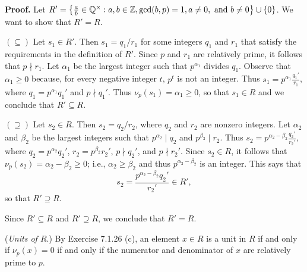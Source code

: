 \begin{enumerate}
      \textbf{Proof.} Let $R' = \left\{\frac{a}{b} \in \mathbb{Q}^\times : a, b \in \mathbb{Z}, 
      \gcd(b, p) = 1, a \neq 0, \text{ and } b \neq 0\right\} \cup \{0\}$. We 
      want to show that $R' = R$.

      $(\subseteq)$ Let $s_1 \in R'$. Then $s_1 = q_1/r_1$ for some integers
      $q_1$ and $r_1$ that satisfy the requirements in the definition of $R'$. 
      Since $p$ and $r_1$ are relatively prime, it follows that $p \nmid r_1$. 
      Let $\alpha_1$ be the largest integer such that $p^{\alpha_1}$ divides
      $q_1$. Observe that $\alpha_1 \ge 0$ because, for every negative integer
      $t$, $p^t$ is not an integer. Thus $s_1 = p^{\alpha_1}\frac{q_1'}{r_1}$, 
      where $q_1 = p^{\alpha_1}q_1'$ and $p \nmid q_1'$. Thus
      $\nu_p(s_1) = \alpha_1 \ge 0$, so that $s_1 \in R$ and we conclude that
      $R' \subseteq R$.
   
      $(\supseteq)$ Let $s_2 \in R$. Then $s_2 = q_2/r_2$, where $q_2$ and $r_2$
      are nonzero integers. Let $\alpha_2$ and $\beta_2$ be the largest integers
      such that $p^{\alpha_2} \mid q_2$ and $p^{\beta_2} \mid r_2$. Thus
      $s_2 = p^{\alpha_2-\beta_2}\frac{q_2'}{r_2'}$, where
      $q_2 = p^{\alpha_2}q_2'$, $r_2 = p^{\beta_2}r_2'$, $p \nmid q_2'$, and
      $p \nmid r_2'$. Since $s_2 \in R$, it follows that
      $\nu_p(s_2) = \alpha_2 - \beta_2 \ge 0$; i.e., $\alpha_2 \ge \beta_2$ and
      thus $p^{\alpha_2-\beta_2}$ is an integer. This says that
      $$s_2 = \frac{p^{\alpha_2-\beta_2}q_2'}{r_2'} \in R',$$
      so that $R' \supseteq R$.

      Since $R' \subseteq R$ and $R' \supseteq R$, we conclude that $R' = R$.

      (\textit{Units of $R$}.) By Exercise 7.1.26 (c), an element $x \in R$ is
      a unit in $R$ if and only if $\nu_p(x) = 0$ if and only if the numerator
      and denominator of $x$ are relatively prime to $p$.


\end{enumerate}
